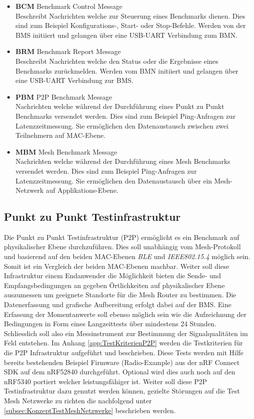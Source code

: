 \begin{itemize}
	\item \textbf{BCM} Benchmark Control Message \\ 
	Beschreibt Nachrichten welche zur Steuerung eines Benchmarks dienen. Dies sind zum Beispiel Konfigurations-, Start- oder Stop-Befehle. Werden von der BMS initiiert und gelangen über eine USB-UART Verbindung zum BMN. 
	\item \textbf{BRM} Benchmark Report Message \\ 
	Beschreibt Nachrichten welche den Status oder die Ergebnisse eines Benchmarks zurückmelden. Werden vom BMN initiiert und gelangen über eine USB-UART Verbindung zur BMS.
	\item \textbf{PBM} P2P Benchmark Message \\ 
	Nachrichten welche während der Durchführung eines Punkt zu Punkt Benchmarks versendet werden. Dies sind zum Beispiel Ping-Anfragen zur Latenzzeitmessung. Sie ermöglichen den Datenaustausch zwischen zwei Teilnehmern auf MAC-Ebene. 
	\item \textbf{MBM} Mesh Benchmark Message \\ 
	Nachrichten welche während der Durchführung eines Mesh Benchmarks versendet werden. Dies sind zum Beispiel Ping-Anfragen zur Latenzzeitmessung. Sie ermöglichen den Datenaustausch über ein Mesh-Netzwerk auf Applikations-Ebene. 
\end{itemize}

\subsection{Punkt zu Punkt Testinfrastruktur}\label{subsec:KonzeptPunktzuPunktTestinfrastruktur}

Die Punkt zu Punkt Testinfrastruktur (P2P) ermöglicht es ein Benchmark auf physikalischer Ebene durchzuführen. Dies soll unabhängig vom Mesh-Protokoll und basierend auf den beiden MAC-Ebenen \textit{BLE} und \textit{IEEE802.15.4} möglich sein. Somit ist ein Vergleich der beiden MAC-Ebenen machbar. Weiter soll diese Infrastruktur einem Endanwender die Möglichkeit bieten die Sende- und Empfangsbedingungen an gegeben Örtlichkeiten auf physikalischer Ebene auszumessen um geeignete Standorte für die Mesh Router zu bestimmen. Die Datenerfassung und grafische Aufbereitung erfolgt dabei auf der BMS. Eine Erfassung der Momentanwerte soll ebenso möglich sein wie die Aufzeichnung der Bedingungen in Form eines Langzeittests über mindestens 24 Stunden.
Schliesslich soll also ein Messinstrument zur Bestimmung der Signalqualitäten im Feld entstehen.
Im Anhang \ref{app:TestKriterienP2P} werden die Testkriterien für die P2P Infrastruktur aufgeführt und beschrieben. Diese Tests werden mit Hilfe bereits bestehenden Beispiel Firmware (Radio-Example) aus der nRF Connect SDK auf dem nRF52840 durchgeführt. Optional wird dies auch noch auf den nRF5340 portiert welcher leistungsfähiger ist.
Weiter soll diese P2P Testinfrastruktur dazu genutzt werden können, gezielte Störungen auf die Test Mesh Netzwerke zu richten die nachfolgend unter \ref{subsec:KonzeptTestMeshNetzwerke} beschrieben werden.


